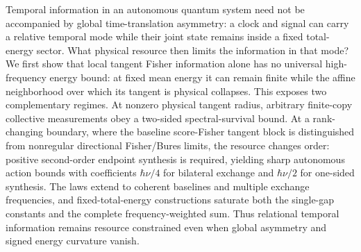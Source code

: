 Temporal information in an autonomous quantum system need not be accompanied by global time-translation asymmetry: a clock and signal can carry a relative temporal mode while their joint state remains inside a fixed total-energy sector. What physical resource then limits the information in that mode? We first show that local tangent Fisher information alone has no universal high-frequency energy bound: at fixed mean energy it can remain finite while the affine neighborhood over which its tangent is physical collapses. This exposes two complementary regimes. At nonzero physical tangent radius, arbitrary finite-copy collective measurements obey a two-sided spectral-survival bound. At a rank-changing boundary, where the baseline score-Fisher tangent block is distinguished from nonregular directional Fisher/Bures limits, the resource changes order: positive second-order endpoint synthesis is required, yielding sharp autonomous action bounds with coefficients $\hbar\nu/4$ for bilateral exchange and $\hbar\nu/2$ for one-sided synthesis. The laws extend to coherent baselines and multiple exchange frequencies, and fixed-total-energy constructions saturate both the single-gap constants and the complete frequency-weighted sum. Thus relational temporal information remains resource constrained even when global asymmetry and signed energy curvature vanish.